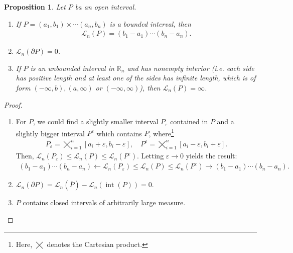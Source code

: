\documentclass[11pt]{book}
\newtheorem{proposition}{Proposition}[chapter]
\theoremstyle{definition}
\numberwithin{equation}{chapter}
\begin{document}
\begin{proposition}
Let $P$ ba an open interval.
\begin{enumerate}
    \item[(a)] If $P = (a_1,b_1) \times \cdots (a_n,b_n)$ is a bounded interval, then 
    \begin{align*}
        \mathcal{L}_n(P) = (b_1-a_1) \cdots (b_n-a_n).
    \end{align*}
    
    \item[(b)] $\mathcal{L}_n(\partial P) = 0$.
    
    \item[(c)] If $P$ is an unbounded interval in $\mathbb{R}_n$ and has nonempty interior (i.e. each side has positive length and at least one of the sides has infinite length, which is of form $(-\infty,b), (a,\infty)$ or $(-\infty,\infty)$), then $\mathcal{L}_n(P) = \infty$.
\end{enumerate}
\end{proposition}
\begin{proof}
~\begin{enumerate}
    \item[(a)] For $P$, we could find a slightly smaller interval $P_\varepsilon$ contained in $P$ and a slightly bigger interval $P^\varepsilon$ which contains $P$, where\footnote{Here, $\bigtimes$ denotes the Cartesian product.}
    \begin{align*}
        P_\varepsilon = \bigtimes^n_{i=1} \left[a_i+\varepsilon,b_i-\varepsilon\right], \quad P^\varepsilon = \bigtimes^n_{i=1} \left[a_i-\varepsilon,b_i+\varepsilon\right].
    \end{align*}
    Then, $\mathcal{L}_n(P_\varepsilon) \leq \mathcal{L}_n(P) \leq \mathcal{L}_n(P^\varepsilon)$. Letting $\varepsilon \to 0$ yields the result:
    \begin{align*}
        (b_1-a_1) \cdots (b_n-a_n) \leftarrow \mathcal{L}_n(P_\varepsilon) \leq \mathcal{L}_n(P) \leq \mathcal{L}_n(P^\varepsilon) \to (b_1-a_1) \cdots (b_n-a_n).
    \end{align*}
    
    \item[(b)] $\mathcal{L}_n(\partial P) =  \mathcal{L}_n(\overline{P}) - \mathcal{L}_n(\operatorname{int}(P)) = 0$.
    
    \item[(c)] $P$ contains closed intervals of arbitrarily large measure.
\end{enumerate}
\end{proof}
\end{document}
